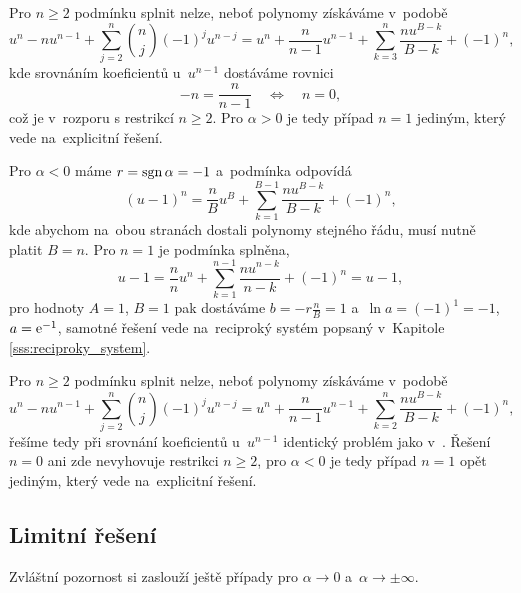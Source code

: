 Pro $n\ge2$ podmínku splnit nelze, neboť polynomy získáváme v~podobě
\begin{equation}\label{eq:lambert_alpha_positive_expanded}
    u^n-nu^{n-1}+\sum_{j=2}^{n}{\binom{n}{j}}(-1)^j u^{n-j}=u^n+\frac{n}{n-1}u^{n-1}+\sum_{k=3}^{n}\frac{nu^{B-k}}{B-k}+(-1)^n,
\end{equation}
kde srovnáním koeficientů u~$u^{n-1}$ dostáváme rovnici
\begin{equation}
    -n=\frac{n}{n-1} \quad \Longleftrightarrow \quad n=0,
\end{equation}
což je v~rozporu s restrikcí $n\ge2$. Pro $\alpha>0$ je tedy případ $n=1$ jediným, který vede na~explicitní řešení.

Pro $\alpha<0$ máme $r=\operatorname{sgn}{\alpha}=-1$ a~podmínka odpovídá
\begin{equation}
    (u-1)^n=\frac{n}{B}u^B+\sum_{k=1}^{B-1}\frac{nu^{B-k}}{B-k}+(-1)^n,
\end{equation}
kde abychom na~obou stranách dostali polynomy stejného řádu, musí nutně platit $B=n$. Pro $n=1$ je podmínka splněna,
\begin{equation}
    u-1=\frac{n}{n}u^n+\sum_{k=1}^{n-1}\frac{nu^{n-k}}{n-k}+(-1)^n=u-1,
\end{equation}
pro hodnoty $A=1$, $B=1$ pak dostáváme $b=-r\frac{n}{B}=1$ a~$\ln a=(-1)^1=-1$, $a=\mathrm{e}^{-1}$, samotné řešení vede na~reciproký systém popsaný v~Kapitole \ref{sss:reciproky_system}.

Pro $n\ge2$ podmínku splnit nelze, neboť polynomy získáváme v~podobě
\begin{equation}
    u^n-nu^{n-1}+\sum_{j=2}^{n}{\binom{n}{j}}(-1)^j u^{n-j}=u^n+\frac{n}{n-1}u^{n-1}+\sum_{k=2}^{n}\frac{nu^{B-k}}{B-k}+(-1)^n,
\end{equation}
řešíme tedy při srovnání koeficientů u~$u^{n-1}$ identický problém jako v~. Řešení $n=0$ ani zde nevyhovuje restrikci $n\ge2$, pro $\alpha<0$ je tedy případ $n=1$ opět jediným, který vede na~explicitní řešení.
\subsection{Limitní řešení}\label{ss:limitni_reseni}
Zvláštní pozornost si zaslouží ještě případy pro $\alpha\to0$ a~$\alpha\to \pm \infty$.
